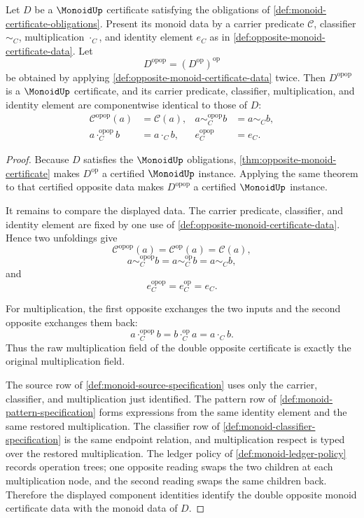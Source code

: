 \begin{theorem}
\label{thm:double-opposite-monoid-certificate-data-identity}
Let $D$ be a $\MonoidUp$ certificate satisfying the obligations of
\autoref{def:monoid-certificate-obligations}. Present its monoid data by a
carrier predicate $\mathcal C$, classifier $\sim_C$, multiplication $\cdot_C$,
and identity element $e_C$ as in \autoref{def:opposite-monoid-certificate-data}.
Let
$$
D^{\mathrm{opop}}=(D^{\mathrm{op}})^{\mathrm{op}}
$$
be obtained by applying \autoref{def:opposite-monoid-certificate-data} twice.
Then $D^{\mathrm{opop}}$ is a $\MonoidUp$ certificate, and its carrier
predicate, classifier, multiplication, and identity element are componentwise
identical to those of $D$:
$$
\begin{aligned}
\mathcal C^{\mathrm{opop}}(a)&=\mathcal C(a),&
 a\sim_C^{\mathrm{opop}} b&=a\sim_C b,\\
a\cdot_C^{\mathrm{opop}} b&=a\cdot_C b,&
 e_C^{\mathrm{opop}}&=e_C.
\end{aligned}
$$
\end{theorem}
\begin{proof}
Because $D$ satisfies the $\MonoidUp$ obligations,
\autoref{thm:opposite-monoid-certificate} makes $D^{\mathrm{op}}$ a certified
$\MonoidUp$ instance. Applying the same theorem to that certified opposite data
makes $D^{\mathrm{opop}}$ a certified $\MonoidUp$ instance.

It remains to compare the displayed data. The carrier predicate, classifier,
and identity element are fixed by one use of
\autoref{def:opposite-monoid-certificate-data}. Hence two unfoldings give
$$
\mathcal C^{\mathrm{opop}}(a)=\mathcal C^{\mathrm{op}}(a)=\mathcal C(a),
$$
$$
a\sim_C^{\mathrm{opop}} b=a\sim_C^{\mathrm{op}} b=a\sim_C b,
$$
and
$$
e_C^{\mathrm{opop}}=e_C^{\mathrm{op}}=e_C.
$$

For multiplication, the first opposite exchanges the two inputs and the second
opposite exchanges them back:
$$
a\cdot_C^{\mathrm{opop}} b
=b\cdot_C^{\mathrm{op}} a
=a\cdot_C b.
$$
Thus the raw multiplication field of the double opposite certificate is exactly
the original multiplication field.

The source row of \autoref{def:monoid-source-specification} uses only the
carrier, classifier, and multiplication just identified. The pattern row of
\autoref{def:monoid-pattern-specification} forms expressions from the same
identity element and the same restored multiplication. The classifier row of
\autoref{def:monoid-classifier-specification} is the same endpoint relation,
and multiplication respect is typed over the restored multiplication. The
ledger policy of \autoref{def:monoid-ledger-policy} records operation trees;
one opposite reading swaps the two children at each multiplication node, and
the second reading swaps the same children back. Therefore the displayed
component identities identify the double opposite monoid certificate data with
the monoid data of $D$.
\end{proof}


